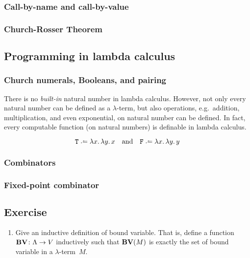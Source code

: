\subsubsection*{Call-by-name and call-by-value}
\subsubsection*{Church-Rosser Theorem}
\begin{definition}
\end{definition}
\subsection{Programming in lambda calculus}
\subsubsection*{Church numerals, Booleans, and pairing}

There is no \emph{built-in} natural number in lambda calculus. However, 
not only every natural number can be defined as a $\lambda$-term, but also 
operations, e.g.\ addition, multiplication, and even exponential, on natural
number can be defined. In fact, every computable function (on natural numbers)
is definable in lambda calculus. 
\begin{definition}
  
\end{definition}

\begin{definition}[Addition]
\end{definition}

\begin{definition}
  \[
    \mathtt{T} \defeq \lambda x.\,\lambda y.\, x
    \quad\text{and}\quad
    \mathtt{F} \defeq \lambda x.\,\lambda y.\, y
  \]
\end{definition}
\subsubsection{Combinators}

\subsubsection*{Fixed-point combinator}

\subsection*{Exercise}
\begin{enumerate}
  \item Give an inductive definition of bound variable. That is, define a
    function $\mathbf{BV}\colon \Lambda \to V$ inductively
    such that $\mathbf{BV}(M)$ is exactly the set of bound variable in a
    $\lambda$-term~$M$.

\end{enumerate}


 

